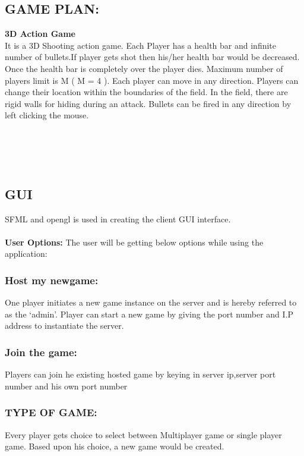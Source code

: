 \documentclass[10pt]{article}
\begin{document}
\subsection{GAME PLAN:}
 \textbf{3D Action Game}\\ It is a 3D Shooting action game.
Each Player has a health bar and infinite number of bullets.If player gets shot then his/her health bar would be decreased. Once the health bar is completely over the player dies. 
Maximum number of players limit is M ( M = 4 ).
Each player can move in any direction.
Players can change their location within the boundaries of the field.
In the field, there are rigid walls for hiding during an attack. Bullets can be fired in any direction by left clicking the mouse. 
\\
\\
\\
\\
\\

	\subsection{GUI}
     SFML and opengl is used in creating the client GUI interface.\\\\ 
     \textbf{User Options:}
	 The user will be getting below options while using the application:  \\
	\subsubsection{Host my newgame:}
			  One player initiates a new game instance on the server and is hereby referred to as the ‘admin’. Player can start a new game by giving the port number and I.P address to instantiate the server.

	\subsubsection{Join the game:}
                         Players can join he existing hosted game by keying in server ip,server port number and his own port number

	\subsubsection{TYPE OF GAME:}
	         Every player gets choice to select between Multiplayer game or single player game. Based upon his choice, a new game would be created.  
\end{document}
